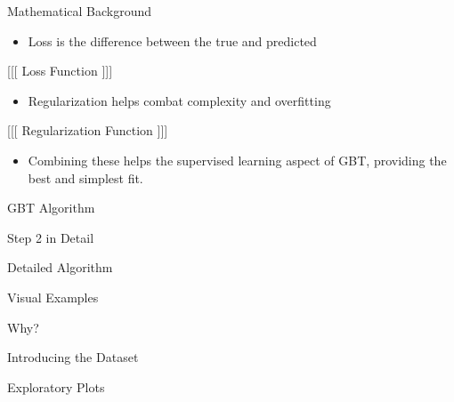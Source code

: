 \documentclass[ignorenonframetext,]{beamer}
\providecommand{\tightlist}{%
  \setlength{\itemsep}{0pt}\setlength{\parskip}{0pt}}
\begin{document}
\begin{frame}{Mathematical Background}

\begin{itemize}
\tightlist
\item
  Loss is the difference between the true and predicted
\end{itemize}

{[}{[}{[} Loss Function {]}{]}{]}

\begin{itemize}
\tightlist
\item
  Regularization helps combat complexity and overfitting
\end{itemize}

{[}{[}{[} Regularization Function {]}{]}{]}

\begin{itemize}
\tightlist
\item
  Combining these helps the supervised learning aspect of GBT, providing
  the best and simplest fit.
\end{itemize}

\end{frame}

\begin{frame}{GBT Algorithm}

\end{frame}

\begin{frame}{Step 2 in Detail}

\end{frame}

\begin{frame}{Detailed Algorithm}

\end{frame}

\begin{frame}{Visual Examples}

\end{frame}

\begin{frame}{Why?}

\end{frame}

\begin{frame}{Introducing the Dataset}

\end{frame}

\begin{frame}{Exploratory Plots}

\end{frame}
\end{document}
